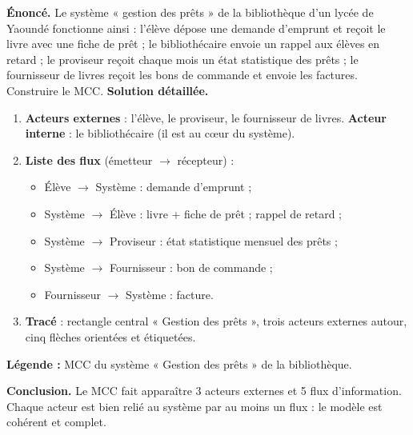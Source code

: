\documentclass[11pt]{article}
\begin{document}
\begin{exoresolu}
\textbf{Énoncé.} Le système « gestion des prêts » de la bibliothèque d'un lycée de Yaoundé fonctionne ainsi : l'élève dépose une demande d'emprunt et reçoit le livre avec une fiche de prêt ; le bibliothécaire envoie un rappel aux élèves en retard ; le proviseur reçoit chaque mois un état statistique des prêts ; le fournisseur de livres reçoit les bons de commande et envoie les factures. Construire le MCC.
\tcblower
\textbf{Solution détaillée.}
\begin{enumerate}
\item \textbf{Acteurs externes} : l'élève, le proviseur, le fournisseur de livres. \textbf{Acteur interne} : le bibliothécaire (il est au cœur du système).
\item \textbf{Liste des flux} (émetteur $\rightarrow$ récepteur) :
\begin{itemize}
\item Élève $\rightarrow$ Système : demande d'emprunt ;
\item Système $\rightarrow$ Élève : livre + fiche de prêt ; rappel de retard ;
\item Système $\rightarrow$ Proviseur : état statistique mensuel des prêts ;
\item Système $\rightarrow$ Fournisseur : bon de commande ;
\item Fournisseur $\rightarrow$ Système : facture.
\end{itemize}
\item \textbf{Tracé} : rectangle central « Gestion des prêts », trois acteurs externes autour, cinq flèches orientées et étiquetées.
\end{enumerate}
\begin{center}
\par\textbf{Légende :} MCC du système « Gestion des prêts » de la bibliothèque.
\end{center}
\textbf{Conclusion.} Le MCC fait apparaître 3 acteurs externes et 5 flux d'information. Chaque acteur est bien relié au système par au moins un flux : le modèle est cohérent et complet.
\end{exoresolu}
\end{document}
